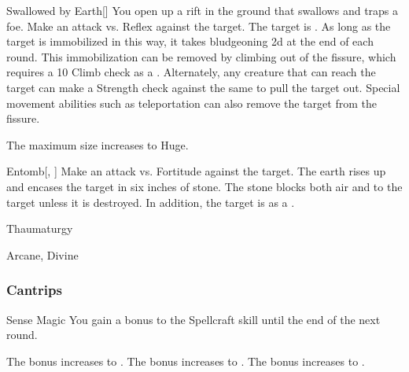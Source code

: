 \lowercase{\hypertarget{spell:Swallowed by Earth}{}}\label{spell:Swallowed by Earth}
\begin{freeability}[Rank 6]{\hypertarget{spell:Swallowed by Earth}{Swallowed by Earth}}[]
You open up a rift in the ground that swallows and traps a foe.
Make an attack vs. Reflex against the target.
\hit The target is .
As long as the target is immobilized in this way,
it takes bludgeoning  \minus2d at the end of each round.
This immobilization can be removed by climbing out of the fissure, which requires a  10 Climb check as a .
Alternately, any creature that can reach the target can make a Strength check against the same  to pull the target out.
Special movement abilities such as teleportation can also remove the target from the fissure.

\rankline
{} The maximum size increases to Huge.
\end{freeability}
\vspace{0.25em}



\lowercase{\hypertarget{spell:Entomb}{}}\label{spell:Entomb}
\begin{freeability}[Rank 8]{\hypertarget{spell:Entomb}{Entomb}}[, ]
Make an attack vs. Fortitude against the target.
\hit The earth rises up and encases the target in six inches of stone.
The stone blocks both air and  to the target unless it is destroyed.
In addition, the target is  as a .
\end{freeability}
\vspace{0.25em}


\newpage
\begin{spellsection}{Thaumaturgy}

\begin{spellheader}
\end{spellheader}


 Arcane, Divine

\subsubsection{Cantrips}


\begin{freeability}{Sense Magic}
You gain a  bonus to the Spellcraft skill until the end of the next round.

\rankline
{} The bonus increases to .
 The bonus increases to .
 The bonus increases to .
\end{freeability}

\end{spellsection}



